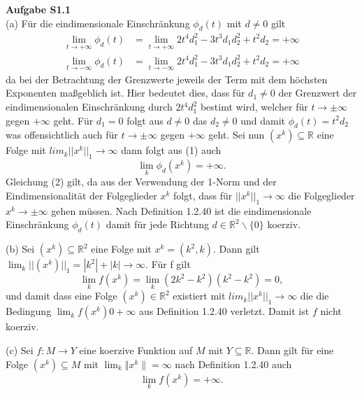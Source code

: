 \documentclass[ngerman, a4paper,12pt]{article}
\newcommand{\R}{\mathbb R} %
\begin{document}
\textbf{Aufgabe S1.1} \\
(a) Für die eindimensionale Einschränkung $\phi_d(t)$ mit $d \neq 0$ gilt
\begin{equation}
	\begin{split}
		\lim\limits_{t \rightarrow +\infty} \phi_d(t) &= \lim\limits_{t \rightarrow +\infty} 2t^4d_1^2 - 3t^3d_1d_2^2+t^2d_2 = + \infty \\
		\lim\limits_{t \rightarrow -\infty} \phi_d(t) &= \lim\limits_{t \rightarrow -\infty} 2t^4d_1^2 - 3t^3d_1d_2^2+t^2d_2 = + \infty
	\end{split}
\end{equation}
da bei der Betrachtung der Grenzwerte jeweils der Term mit dem höchsten Exponenten maßgeblich ist. Hier bedeutet dies, dass für $d_1 \neq 0$ der Grenzwert der eindimensionalen Einschränkung durch $2t^4d_1^2$ bestimt wird, welcher für $t \rightarrow \pm \infty$ gegen $+ \infty$ geht. Für $d_1=0$ folgt aus $d \neq 0$ das $d_2 \neq 0$ und damit $\phi_d(t)=t^2d_2$ was offensichtlich auch für $t \rightarrow \pm \infty$ gegen $+ \infty$ geht. Sei nun $(x^k) \subseteq \R$ eine Folge mit $lim_k ||x^k||_1 \rightarrow \infty$ dann folgt aus (1) auch
\begin{equation}
	\lim\limits_{k} \phi_d(x^k) = + \infty.
\end{equation}
Gleichung (2) gilt, da aus der Verwendung der 1-Norm und der Eindimensionalität der Folgeglieder $x^k$ folgt, dass für $||x^k||_1 \rightarrow \infty$ die Folgeglieder $x^k \rightarrow \pm \infty$ gehen müssen. Nach Definition 1.2.40 ist die eindimensionale Einschränkung $\phi_d(t)$ damit für jede Richtung $d \in \mathbb{R}^2 \backslash \{0\}$ koerziv. \par
(b) Sei $(x^k) \subseteq \mathbb{R}^2$ eine Folge mit $x^k = (k^2, k)$. Dann gilt $\lim_k ||(x^k)||_1 = |k^2|+|k| \rightarrow \infty$. Für f gilt
\begin{equation}
	\lim\limits_{k} f(x^k) = \lim\limits_{k} (2k^2-k^2)(k^2-k^2) = 0,
\end{equation}
und damit dass eine Folge $(x^k) \in \mathbb{R}^2$ existiert mit $lim_k ||x^k||_1 \rightarrow \infty$ die die Bedingung $\lim_k f(x^k) 0 + \infty$ aus Definition 1.2.40 verletzt. Damit ist $f$ nicht koerziv. \par
(c) Sei $f: M \rightarrow Y$ eine koerzive Funktion auf $M$ mit $Y \subseteq \mathbb{R}$. Dann gilt für eine Folge $(x^k) \subseteq M$ mit $\lim_{k} \Vert x^k \| = \infty$ nach Definition 1.2.40 auch
\begin{equation*}
\lim\limits_{k} f(x^k) = + \infty .
\end{equation*}
\end{document}
